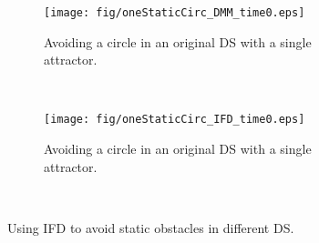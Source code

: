 \begin{figure}[tb]\centering
\begin{subfigure}{.48\columnwidth} %
\centering
\texttt{[image: fig/oneStaticCirc\_DMM\_time0.eps]}
\caption{Avoiding a circle in an original DS with a single attractor.}
\label{fig:oneStaticCirc_DNN}
\end{subfigure}\,\, %
\begin{subfigure}{.48\columnwidth} %
\centering
\texttt{[image: fig/oneStaticCirc\_IFD\_time0.eps]}
\caption{Avoiding a circle in an original DS with a single attractor.}
\label{fig:oneStaticCirc_IFD}
\end{subfigure}\,\, %
\caption{Using IFD to avoid static obstacles in different DS.}
\label{fig:static_IFD}
\end{figure}




